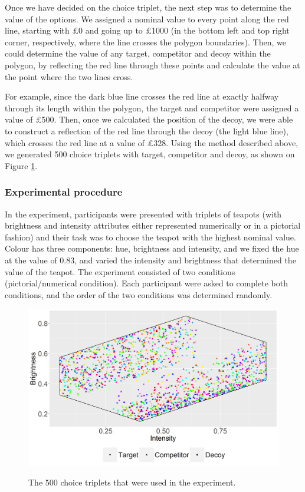 \documentclass[11pt,a4paper]{article}
\begin{document}
Once we have decided on the choice triplet, the next step was to determine the value of the options. We assigned a nominal value to every point along the red line, starting with £0 and going up to £1000 (in the bottom left and top right corner, respectively, where the line crosses the polygon boundaries). Then, we could determine the value of any target, competitor and decoy within the polygon, by reflecting the red line through these points and calculate the value at the point where the two lines cross. 

For example, since the dark blue line crosses the red line at exactly halfway through its length within the polygon, the target and competitor were assigned a value of £500. Then, once we calculated the position of the decoy, we were able to construct a reflection of the red line through the decoy (the light blue line), which crosses the red line at a value of £328. Using the method described above, we generated 500 choice triplets with target, competitor and decoy, as shown on Figure \ref{fig:choice_sets}. 

\subsubsection{Experimental procedure}

In the experiment, participants were presented with triplets of teapots (with brightness and intensity attributes either represented numerically or in a pictorial fashion) and their task was to choose the teapot with the highest nominal value. Colour has three components: hue, brightness and intensity, and we fixed the hue at the value of 0.83, and varied the 
intensity and brightness that determined the value of the teapot. The experiment consisted of two conditions (pictorial/numerical condition). Each participant were asked to complete both conditions, and the order of the two conditions was determined randomly. 


\begin{figure}
\centering
\caption{The 500 choice triplets that were used in the experiment.}
\includegraphics[width=1\textwidth]{Figure_2poly.png}
\label{fig:choice_sets}
\end{figure}
\end{document}
